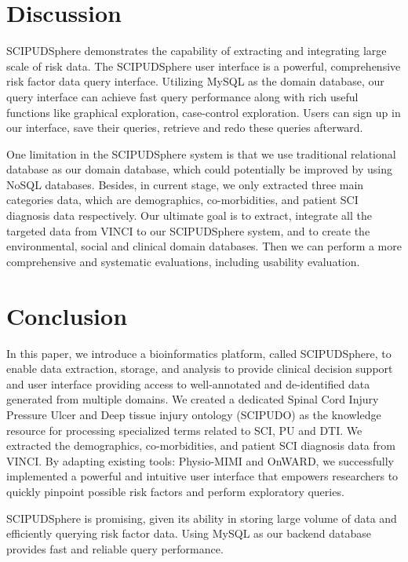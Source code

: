 \documentclass{amia}
\begin{document}
\section{Discussion}
SCIPUDSphere demonstrates the capability of extracting and integrating large scale of risk data. The SCIPUDSphere user interface is a powerful, comprehensive risk factor data query interface. Utilizing MySQL as the domain database, our query interface can achieve fast query performance along with rich useful functions like graphical exploration, case-control exploration. Users can sign up in our interface, save their queries, retrieve and redo these queries afterward. 

One limitation in the SCIPUDSphere system is that we use traditional relational database as our domain database, which could potentially be improved by using NoSQL databases. Besides, in current stage, we only extracted three main categories data, which are demographics, co-morbidities, and patient SCI diagnosis data respectively. Our ultimate goal is to extract, integrate all the targeted data from VINCI to our SCIPUDSphere system, and to create the environmental, social and clinical domain databases. Then we can perform a more comprehensive and systematic evaluations, including usability evaluation. 

\section{Conclusion}
In this paper, we introduce a bioinformatics platform, called SCIPUDSphere, to enable data extraction, storage, and analysis to provide clinical decision support and user interface providing access to well-annotated and de-identified data generated from multiple domains. We created a dedicated Spinal Cord Injury Pressure Ulcer and Deep tissue injury ontology (SCIPUDO) as the knowledge resource for processing specialized terms related to SCI, PU and DTI. We extracted the demographics, co-morbidities, and patient SCI diagnosis data from VINCI. By adapting existing tools: Physio-MIMI and OnWARD, we successfully implemented a powerful and intuitive user interface that empowers researchers to quickly pinpoint possible risk factors and perform exploratory queries.

SCIPUDSphere is promising, given its ability in storing large volume of data and efficiently querying risk factor data. Using MySQL as our backend database provides fast and reliable query performance.

\end{document}
